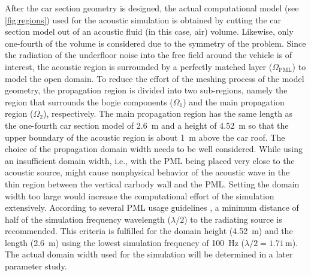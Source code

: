 After the car section geometry is designed, the actual computational model (see \cref{fig:regions}) used for the acoustic simulation is obtained by cutting the car section model out of an acoustic fluid (in this case, air) volume. Likewise, only one-fourth of the volume is considered due to the symmetry of the problem. Since the radiation of the underfloor noise into the free field around the vehicle is of interest, the acoustic region is surrounded by a perfectly matched layer ($\Omega_{\text{PML}}$) to model the open domain. To reduce the effort of the meshing process of the model geometry, the propagation region is divided into two sub-regions, namely the region that surrounds the bogie components ($\Omega_1$) and the main propagation region ($\Omega_2$), respectively. The main propagation region has the same length as the one-fourth car section model of \SI{2.6}{\meter} and a height of \SI{4.52}{\meter} so that the upper boundary of the acoustic region is about \SI{1}{\meter} above the car roof. The choice of the propagation domain width needs to be well considered. While using an insufficient domain width, i.e., with the PML being placed very close to the acoustic source, might cause nonphysical behavior of the acoustic wave in the thin region between the vertical carbody wall and the PML. Setting the domain width too large would increase the computational effort of the simulation extensively. According to several PML usage guidelines \cite{PML_comsol, PML_quickwave, PML_3ds}, a minimum distance of half of the simulation frequency wavelength ($\lambda/2$) to the radiating source is recommended. This criteria is fulfilled for the domain height (\SI{4.52}{\meter}) and the length (\SI{2.6}{\meter}) using the lowest simulation frequency of \SI{100}{\hertz} ($\lambda / 2 = 1.71\,\text{m}$). The actual domain width used for the simulation will be determined in a later parameter study.

